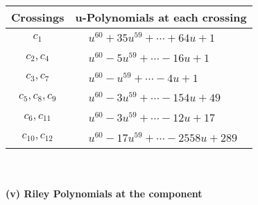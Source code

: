 \documentclass[1p]{elsarticle_modified}
\theoremstyle{definition}
\begin{document}
\begin{tabular}{m{50pt}|m{274pt}}
Crossings & \hspace{64pt}u-Polynomials at each crossing \\
\hline $$\begin{aligned}c_{1}\end{aligned}$$&$\begin{aligned}
&u^{60}+35 u^{59}+\cdots+64 u+1
\end{aligned}$\\
\hline $$\begin{aligned}c_{2},c_{4}\end{aligned}$$&$\begin{aligned}
&u^{60}-5 u^{59}+\cdots-16 u+1
\end{aligned}$\\
\hline $$\begin{aligned}c_{3},c_{7}\end{aligned}$$&$\begin{aligned}
&u^{60}- u^{59}+\cdots-4 u+1
\end{aligned}$\\
\hline $$\begin{aligned}c_{5},c_{8},c_{9}\end{aligned}$$&$\begin{aligned}
&u^{60}-3 u^{59}+\cdots-154 u+49
\end{aligned}$\\
\hline $$\begin{aligned}c_{6},c_{11}\end{aligned}$$&$\begin{aligned}
&u^{60}-3 u^{59}+\cdots-12 u+17
\end{aligned}$\\
\hline $$\begin{aligned}c_{10},c_{12}\end{aligned}$$&$\begin{aligned}
&u^{60}-17 u^{59}+\cdots-2558 u+289
\end{aligned}$\\
\hline
\end{tabular}\\~\\
\newpage\renewcommand{\arraystretch}{1}
\flushleft \textbf{(v) Riley Polynomials at the component}\newline \\
\end{document}

